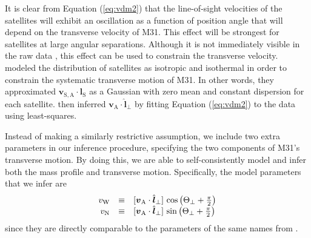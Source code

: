 \documentclass[preprint,12pt]{aastex}
\newcommand{\figlabel}[1]{\label{fig:#1}}
\newcommand{\eq}[1]{Equation (\ref{eq:#1})}
\newcommand{\bvec}[1]{\ensuremath{\boldsymbol{#1}}}
\renewcommand{\vector}[1]{\ensuremath{\bvec{#1}}}
\newcommand{\vel}[1]{\ensuremath{\vector{v}_\mathrm{#1}}}
\newcommand{\vrel}[2]{\ensuremath{\vector{v}_{\mathrm{#1},\mathrm{#2}}}}
\newcommand{\losperp}{\ensuremath{\hat{\vector{l}}_\perp}}
\newcommand{\lossat}{\ensuremath{\hat{\vector{l}}_\mathrm{S}}}
\newcommand{\posangperp}{\ensuremath{\Theta_\perp}}
\newcommand{\vw}{\ensuremath{v_\mathrm{W}}}
\newcommand{\vn}{\ensuremath{v_\mathrm{N}}}
\begin{document}
It is clear from \eq{vdm2} that the line-of-sight velocities of
the satellites will exhibit an oscillation as a function of position angle
that will depend on the transverse velocity of M31.  This effect will be
strongest for satellites at large angular separations.  Although it is not
immediately visible in the raw data \citep[see figure 1 of][]{vdm}, this
effect can be used to constrain the transverse velocity. \citet{vdm}
modeled the distribution of satellites as isotropic and isothermal in
order to constrain the systematic transverse motion of M31. In other words,
they approximated $\vrel{S}{A}\cdot\lossat$ as a Gaussian with zero mean
and constant dispersion for each satellite. \citet{vdm} then inferred
$\vel{A}\cdot\losperp$ by fitting \eq{vdm2} to the data using least-squares.

Instead of making a similarly restrictive assumption, we include two extra
parameters in our inference procedure, specifying the two components of M31's
transverse motion. By doing this, we are able to self-consistently model and
infer both the mass profile and transverse motion. Specifically, the
model parameters that we infer are
\begin{equation}
    \begin{array}{r c l}
    \vw & \equiv & [\vel{A}\cdot\losperp]
            \, \cos\left ( \posangperp + \frac{\pi}{2} \right ) \\
    \vn & \equiv & [\vel{A}\cdot\losperp]
            \, \sin \left ( \posangperp + \frac{\pi}{2} \right )
    \end{array}
\end{equation}
since they are directly comparable to the parameters of the same names
from \citet{vdm}.



\clearpage

\end{document}
